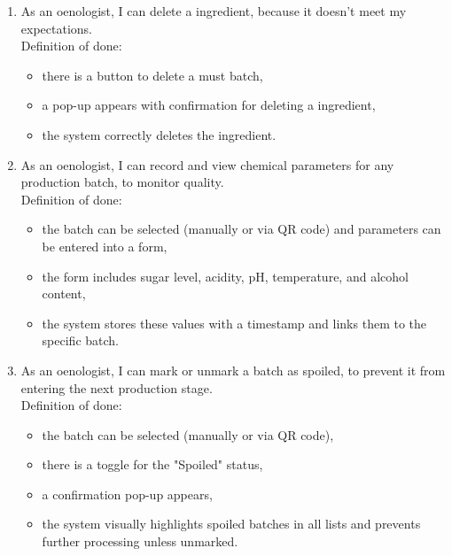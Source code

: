 \begin{enumerate}
\begin{itemize}
	\end{itemize}
	\item As an oenologist, I can delete a ingredient, because it doesn't meet my expectations.
	\\Definition of done:
	\begin{itemize}
		\item there is a button to delete a must batch,
		\item a pop-up appears with confirmation for deleting a ingredient,
		\item the system correctly deletes the ingredient.
	\end{itemize}
	\item As an oenologist, I can record and view chemical parameters for any production batch, to monitor quality.
	\\Definition of done:
	\begin{itemize}
		\item the batch can be selected (manually or via QR code) and parameters can be entered into a form,
		\item the form includes sugar level, acidity, pH, temperature, and alcohol content,
		\item the system stores these values with a timestamp and links them to the specific batch.
	\end{itemize}
	\item As an oenologist, I can mark or unmark a batch as spoiled, to prevent it from entering the next production stage.
	\\Definition of done:
	\begin{itemize}
		\item the batch can be selected (manually or via QR code),
		\item there is a toggle for the "Spoiled" status,
		\item a confirmation pop-up appears,
		\item the system visually highlights spoiled batches in all lists and prevents further processing unless unmarked.
	\end{itemize}

\end{enumerate}
